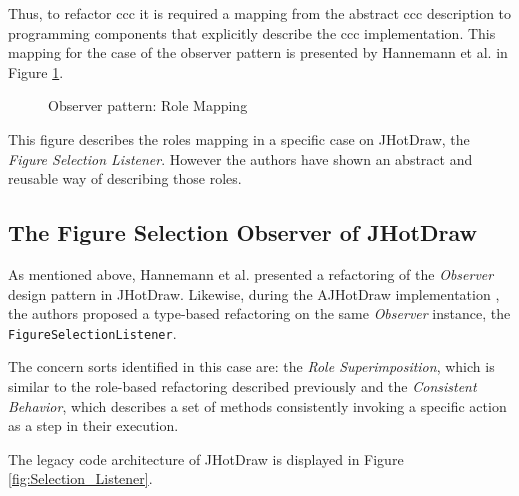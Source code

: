 Thus, to refactor \ac{ccc} it is required a mapping from the abstract \ac{ccc} description to programming components that explicitly describe the \ac{ccc} implementation.
This mapping for the case of the observer pattern is presented by Hannemann et al. \cite{hannemann2005role} in Figure \ref{fig:Observer_Role_Mapping}.

\begin{figure}[H]
	\centering
  	\caption{Observer pattern: Role Mapping \cite{hannemann2005role}}
  	\label{fig:Observer_Role_Mapping}
\end{figure}

This figure describes the roles mapping in a specific case on JHotDraw, the \textit{Figure Selection Listener}.
However the authors have shown an abstract and reusable way of describing those roles.

\subsection{The Figure Selection Observer of JHotDraw}\label{The Figure Selection Observer of JHotDraw}
As mentioned above, Hannemann et al. \cite{hannemann2005role} presented a refactoring of the \textit{Observer} design pattern in JHotDraw.
Likewise, during the AJHotDraw implementation\cite{marin2005approach} \cite{hannemann2005role}, the authors proposed a type-based refactoring on the same \textit{Observer} instance, the \texttt{FigureSelectionListener}.

The concern sorts identified in this case are: the \textit{Role Superimposition}, which is similar to the role-based refactoring described previously and the \textit{Consistent Behavior}, which describes a set of methods consistently invoking a specific action as a step in their execution.

The legacy code architecture of JHotDraw is displayed in Figure \ref{fig:Selection_Listener}.

